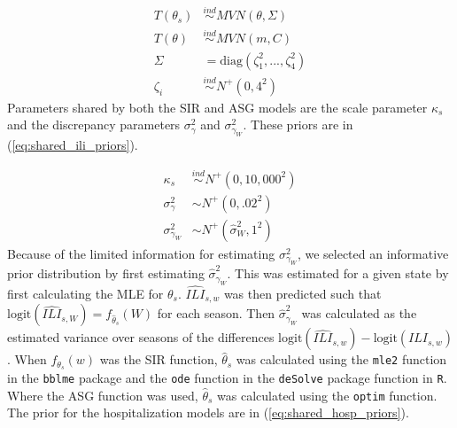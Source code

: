 \documentclass[ba]{imsart}
\theoremstyle{plain}
\theoremstyle{definition}
\theoremstyle{remark}
\begin{document}
\begin{equation}
\begin{aligned}
\label{eq:ili_prior}
                T(\theta_s) &\overset{ind}{\sim} MVN(\theta, \Sigma) \\
                T(\theta) &\overset{ind}{\sim} MVN(m, C)\\
                \Sigma &= \text{diag}(\zeta^2_1,...,\zeta^2_4) \\
                \zeta_i &\overset{ind}{\sim} N^+(0,4^2)
\end{aligned}
\end{equation}
Parameters shared by both the SIR and ASG models are the scale parameter $\kappa_s$ and the discrepancy parameters $\sigma_{\gamma}^2$ and $\sigma_{\gamma_W}^2$. These priors are in (\ref{eq:shared_ili_priors}). 

\begin{equation}
\begin{aligned}
    \label{eq:shared_ili_priors}
        \kappa_s &\overset{ind}{\sim} N^+(0, 10,000^2) \\
        \sigma_{\gamma}^2 &\sim N^+(0, .02^2) \\
        \sigma_{\gamma_W}^2 &\sim N^+(\hat{\sigma}_W^2, 1^2)
\end{aligned}
\end{equation}
Because of the limited information for estimating $\sigma_{\gamma_W}^2$, we selected an informative prior distribution by first estimating  $\hat{\sigma}_{\gamma_W}^2$. This was estimated for a given state by first calculating the MLE for $\theta_s$. 
$\widehat{ILI}_{s,w}$ was then predicted such that $\text{logit}(\widehat{ILI}_{s,W}) = f_{\hat{\theta}_s}(W)$ for each season. Then $\hat{\sigma}_{\gamma_W}^2$ was calculated as the estimated variance over seasons of the differences $\text{logit}(\widehat{ILI}_{s,w}) - \text{logit}(ILI_{s,w})$. When $f_{\theta_s}(w)$ was the SIR function, $\widehat{\theta}_s$ was calculated using the \texttt{mle2} function in the \texttt{bblme} package \cite[]{bolker2023bblme} and the \texttt{ode} function in the \texttt{deSolve} package \cite[]{soetaert2010desolve} function in \texttt{R}. Where the ASG function was used,  $\hat{\theta}_s$ was calculated using the \texttt{optim} function.
The prior for the hospitalization models are in (\ref{eq:shared_hosp_priors}).
\end{document}
